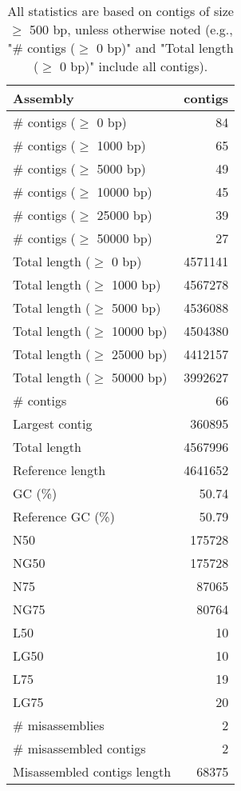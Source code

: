 \documentclass[12pt,a4paper]{article}
\begin{document}
\begin{table}[ht]
\begin{center}
\caption{All statistics are based on contigs of size $\geq$ 500 bp, unless otherwise noted (e.g., "\# contigs ($\geq$ 0 bp)" and "Total length ($\geq$ 0 bp)" include all contigs).}
\begin{tabular}{|l*{1}{|r}|}
\hline
Assembly & contigs \\ \hline
\# contigs ($\geq$ 0 bp) & 84 \\ \hline
\# contigs ($\geq$ 1000 bp) & 65 \\ \hline
\# contigs ($\geq$ 5000 bp) & 49 \\ \hline
\# contigs ($\geq$ 10000 bp) & 45 \\ \hline
\# contigs ($\geq$ 25000 bp) & 39 \\ \hline
\# contigs ($\geq$ 50000 bp) & 27 \\ \hline
Total length ($\geq$ 0 bp) & 4571141 \\ \hline
Total length ($\geq$ 1000 bp) & 4567278 \\ \hline
Total length ($\geq$ 5000 bp) & 4536088 \\ \hline
Total length ($\geq$ 10000 bp) & 4504380 \\ \hline
Total length ($\geq$ 25000 bp) & 4412157 \\ \hline
Total length ($\geq$ 50000 bp) & 3992627 \\ \hline
\# contigs & 66 \\ \hline
Largest contig & 360895 \\ \hline
Total length & 4567996 \\ \hline
Reference length & 4641652 \\ \hline
GC (\%) & 50.74 \\ \hline
Reference GC (\%) & 50.79 \\ \hline
N50 & 175728 \\ \hline
NG50 & 175728 \\ \hline
N75 & 87065 \\ \hline
NG75 & 80764 \\ \hline
L50 & 10 \\ \hline
LG50 & 10 \\ \hline
L75 & 19 \\ \hline
LG75 & 20 \\ \hline
\# misassemblies & 2 \\ \hline
\# misassembled contigs & 2 \\ \hline
Misassembled contigs length & 68375 \\ \hline

\end{tabular}
\end{center}
\end{table}
\end{document}
